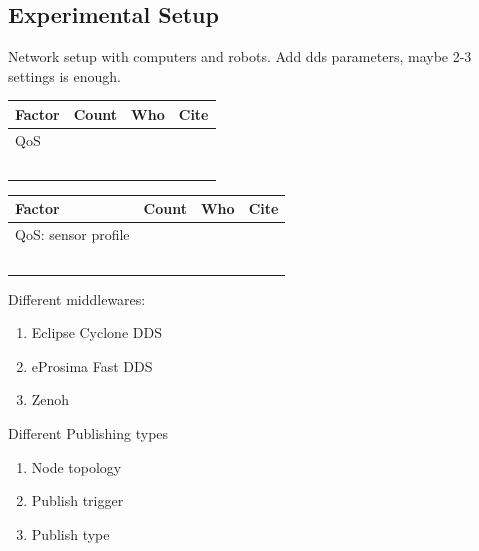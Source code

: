 \chapter{}
\label{sec:results}
\section{Experimental Setup}
Network setup with computers and robots.
Add dds parameters, maybe 2-3 settings is enough.
\begin{table}[htbp]
\centering
\begin{tabular}{|l|l|l|l|}
    \hline
Factor & Count & Who & Cite \\\hline
   QoS &     &  &    \\\hline
       &     &   &   \\\hline
       &     &   &   \\\hline
       &     &   &   \\\hline
       &     &   &   \\\hline
       &     &   &   \\\hline
\end{tabular}
\end{table}

\begin{table}[htbp]
    \centering
\begin{tabular}{|l|l|l|l|}
    \hline
Factor & Count & Who & Cite \\\hline
   QoS: sensor profile     &     &  &    \\\hline
       &     &   &   \\\hline
       &     &   &   \\\hline
       &     &   &   \\\hline
       &     &   &   \\\hline
       &     &   &   \\\hline
       
\end{tabular}
\end{table}

Different middlewares:
\begin{enumerate}
    \item Eclipse Cyclone DDS
    \item eProsima Fast DDS
    \item Zenoh
\end{enumerate}
Different Publishing types
\begin{enumerate}
    \item Node topology
    \item Publish trigger
    \item Publish type 
\end{enumerate}

